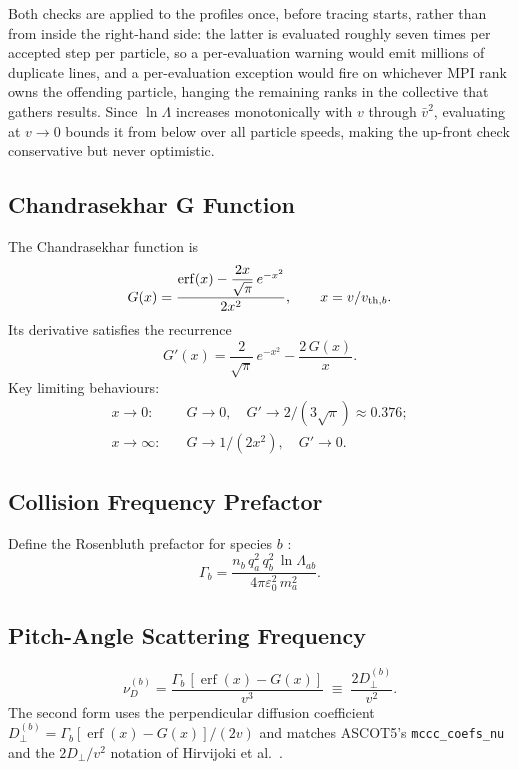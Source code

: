 \documentclass[11pt]{article}
\newcommand{\vth}[1][]{v_{\mathrm{th}\ifx&#1&\else,#1\fi}}
\newcommand{\lnL}{\ln\Lambda}
\newcommand{\eps}{\varepsilon_0}
\newcommand{\erf}{\operatorname{erf}}
\begin{document}
Both checks are applied to the profiles once, before tracing starts, rather
than from inside the right-hand side: the latter is evaluated roughly seven
times per accepted step per particle, so a per-evaluation warning would emit
millions of duplicate lines, and a per-evaluation exception would fire on
whichever MPI rank owns the offending particle, hanging the remaining ranks
in the collective that gathers results.  Since $\lnL$ increases
monotonically with $v$ through $\bar{v}^2$, evaluating at $v\to0$ bounds it
from below over all particle speeds, making the up-front check conservative
but never optimistic.

\subsection{Chandrasekhar G Function}

The Chandrasekhar function \cite{chandrasekhar1943} is
\begin{equation}
  G(x) = \frac{\erf(x) - \dfrac{2x}{\sqrt{\pi}}\,e^{-x^2}}{2x^2},
  \qquad x = v/\vth[b].
\end{equation}
Its derivative satisfies the recurrence
\begin{equation}
  G'(x) = \frac{2}{\sqrt{\pi}}\,e^{-x^2} - \frac{2\,G(x)}{x}.
\end{equation}
Key limiting behaviours:
\begin{align*}
  x\to 0:&\quad G\to 0,\quad G'\to 2/(3\sqrt{\pi})\approx 0.376; \\
  x\to\infty:&\quad G\to 1/(2x^2),\quad G'\to 0.
\end{align*}

\subsection{Collision Frequency Prefactor}

Define the Rosenbluth prefactor for species $b$ \cite{rosenbluth1957,trubnikov1965}:
\begin{equation}
  \Gamma_b = \frac{n_b\,q_a^2\,q_b^2\,\lnL_{ab}}
                  {4\pi\eps^2\,m_a^2}.
  \label{eq:Gamma}
\end{equation}

\subsection{Pitch-Angle Scattering Frequency}

\begin{equation}
  \nu_D^{(b)} = \frac{\Gamma_b\,[\erf(x) - G(x)]}{v^3}
  \;\equiv\; \frac{2D_\perp^{(b)}}{v^2}.
  \label{eq:nuD}
\end{equation}
The second form uses the perpendicular diffusion coefficient
$D_\perp^{(b)} = \Gamma_b[\erf(x)-G(x)]/(2v)$
and matches ASCOT5's \texttt{mccc\_coefs\_nu} and the $2D_\perp/v^2$
notation of Hirvijoki et al.\ \cite{hirvijoki2013,hirvijoki2014}.
\end{document}
